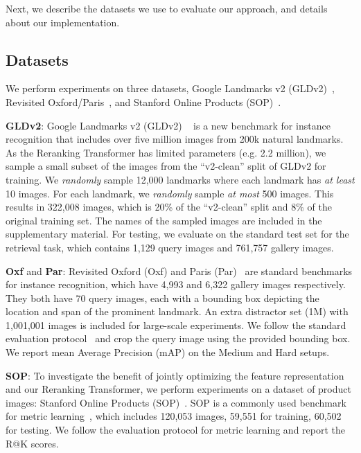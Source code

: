 \vspace{-0.05in}
Next, we describe the datasets we use to evaluate our approach, and details about our implementation.
\vspace{-0.05in}

\subsection{Datasets}
We perform experiments on three datasets, Google Landmarks v2 (GLDv2)~\cite{gldv2}, Revisited Oxford/Paris~\cite{revisited}, and Stanford Online Products (SOP)~\cite{sop2016}. 


\textbf{GLDv2}: Google Landmarks v2 (GLDv2) ~\cite{gldv2} is a new benchmark for instance recognition that includes over five million images from 200k natural landmarks.
As the Reranking Transformer has limited parameters (e.g. 2.2 million), we sample a small subset of the images from the ``v2-clean'' split of GLDv2 for training.
We \textit{randomly} sample 12,000 landmarks where each landmark has \textit{at least} 10 images.
For each landmark, we \textit{randomly} sample \textit{at most} 500 images.
This results in 322,008 images, which is 20\% of the ``v2-clean'' split and 8\% of the original training set. 
The names of the sampled images are included in the supplementary material.
For testing, we evaluate on the standard test set for the retrieval task, which contains 1,129 query images and 761,757 gallery images.

\textbf{Oxf} and \textbf{Par}: 
Revisited Oxford (Oxf) and Paris (Par)~\cite{revisited} are standard benchmarks for instance recognition, which have 4,993 and 6,322 gallery images respectively. 
They both have 70 query images, each with a bounding box depicting the location and span of the prominent landmark. 
An extra distractor set (1M) with 1,001,001 images is included for large-scale experiments.
We follow the standard evaluation protocol~\cite{revisited, delg2020} and crop the query image using the provided bounding box.
We report mean Average Precision (mAP) on the Medium and Hard setups.

\textbf{SOP}: To investigate the benefit of jointly optimizing the feature representation and our Reranking Transformer, we perform experiments on a dataset of product images: Stanford Online Products (SOP)~\cite{sop2016}. 
SOP is a commonly used benchmark for metric learning~\cite{margin2017,divide2019,MIC2019, fastap2019,roth2020revisiting, XBM2020, CE2020}, which includes 120,053 images, 59,551 for training, 60,502 for testing. 
We follow the evaluation protocol for metric learning and report the R@K scores.

